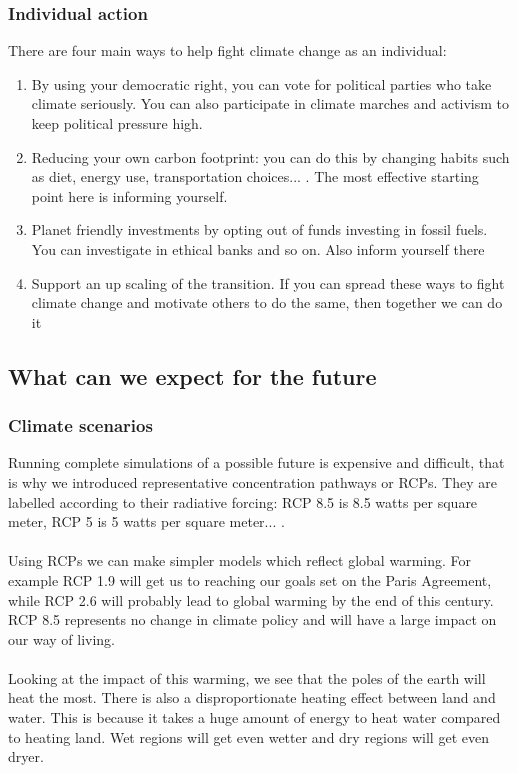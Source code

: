 \documentclass[../summary.tex]{subfiles}
\begin{document}
			\subsubsection{Individual action} 
				There are four main ways to help fight climate change as an individual:
				\begin{enumerate}
					\item By using your democratic right, you can vote for political parties who take climate seriously. You can also participate in climate marches and activism to keep political pressure high. 
					\item Reducing your own carbon footprint: you can do this by changing habits such as diet, energy use, transportation choices... . The most effective starting point here is informing yourself. 
					\item Planet friendly investments by opting out of funds investing in fossil fuels. You can investigate in ethical banks and so on. Also inform yourself there
					\item Support an up scaling of the transition. If you can spread these ways to fight climate change and motivate others to do the same, then together we can do it
				\end{enumerate}
				
		\subsection{What can we expect for the future}
			\subsubsection{Climate scenarios}
				Running complete simulations of a possible future is expensive and difficult, that is why we introduced  representative concentration pathways or RCPs. They are labelled according to their radiative forcing: RCP 8.5 is 8.5 watts per square meter, RCP 5 is 5 watts per square meter... . \\
				\\
				Using RCPs we can make simpler models which reflect global warming. For example RCP 1.9 will get us to reaching our goals set on the Paris Agreement, while RCP 2.6 will probably lead to global warming by the end of this century. RCP 8.5 represents no change in climate policy and will have a large impact on our way of living. \\
				\\
				Looking at the impact of this warming, we see that the poles of the earth will heat the most. There is also a disproportionate heating effect between land and water. This is because it takes a huge amount of energy to heat water compared to heating land. Wet regions will get even wetter and dry regions will get even dryer. 
				
\end{document}
